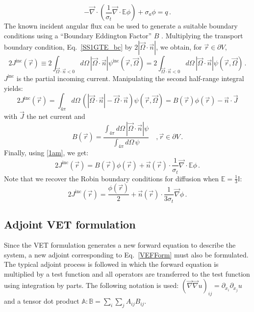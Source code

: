 \documentclass[12pt]{report}
\newcommand{\vr}{\vec{r}}
\newcommand{\vJ}{\vec{J}}
\newcommand{\vO}{\vec{\Omega}}
\renewcommand{\div}{\vec{\nabla} \cdot}
\newcommand{\grad}{\vec{\nabla}}
\newcommand{\bound}{\partial V}
\newcommand{\vn}{\vec{n}}
\newcommand{\Edd}{\mathbb{E}}
\newcommand{\BEdd}{B}
\newcommand{\sigt}{\sigma_t}
\newcommand{\siga}{\sigma_a}
\newcommand{\scalSource}{q}
\begin{document}
\begin{equation}
\label{VEFForm}
- \div \left( \frac{1}{\sigt}\div \Edd \phi \right) + \siga \phi = \scalSource \,.
\end{equation}
The known incident angular flux can be used to generate a suitable boundary conditions using a 
``Boundary Eddington Factor'' $\BEdd$ \cite{Miften}. Multiplying the transport boundary condition,
Eq.~\eqref{SS1GTE_bc} by $2 | \vO \cdot \vn |$, we obtain, for $\vr \in \bound$,
\begin{equation}
2 J^{\text{inc}}(\vr) \equiv  2 \int_{\vO \cdot \vn <0 }  d \Omega\, | \vO \cdot \vec{n} | \psi^{\text{inc}}(\vr,\vO) 
= 2\int_{\vO \cdot \vn <0 } d \Omega\,  | \vO \cdot \vn |  \psi(\vr,\vO) \,.
\end{equation}
$J^{\text{inc}}$ is the partial incoming current. 
Manipulating the second half-range integral yields:
\begin{equation}
2 J^{\text{inc}}(\vr) = \int_{4\pi} d \Omega\,  \left( | \vO \cdot \vn |- \vO\cdot\vn\right)  \psi(\vr,\vO) 
= \BEdd(\vr) \phi(\vr) - \vn \cdot \vJ 
\end{equation}
with $\vJ$ the net current and
\begin{equation}
\BEdd(\vr) = \frac{\int_{4 \pi} d\Omega \, | \vO \cdot \vn | \psi}{\int_{4\pi} d\Omega \, \psi} \quad , \vr \in \bound \,.
\end{equation}
Finally, using \eqref{1am}, we get:
\begin{equation}
2 J^{\text{inc}}(\vr) = \BEdd(\vr) \phi(\vr) + \vn(\vr) \cdot \frac{1}{\sigt} \div \Edd \phi \,.
\end{equation}
Note that we recover the Robin boundary conditions for diffusion when $\Edd = \tfrac{1}{3} \mathbb{I}$:
\[
2 J^{\text{inc}}(\vr) = \frac{\phi(\vr)}{2} + \vn(\vr) \cdot \frac{1}{3\sigt} \grad \phi \,.
\]


\subsection{Adjoint VET formulation}

Since the VET formulation generates a new forward equation to describe the system, a new adjoint corresponding to Eq.~\eqref{VEFForm} must also be formulated. The typical adjoint process is followed in which the forward equation is multiplied by a test function and all operators are transferred to the test function using integration by parts. The following notation is used: $(\grad \grad u)_{ij} = \partial_{x_i} \partial_{x_j} u$
and a tensor dot product $\mathbb{A} : \mathbb{B} = \sum_i \sum_j A_{ij}B_{ij}$.
\end{document}
